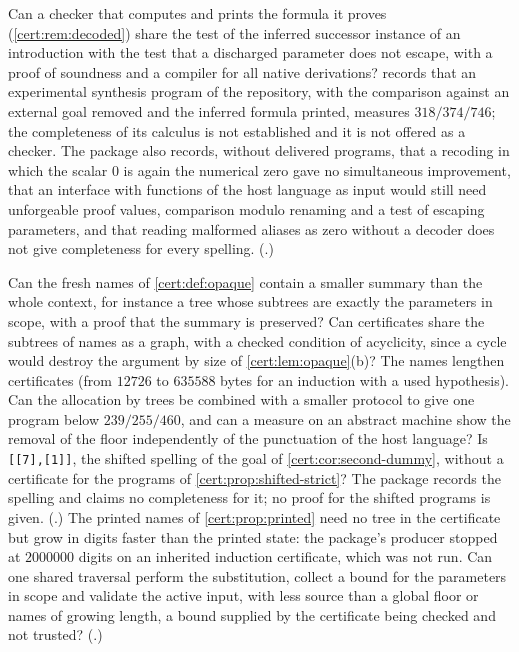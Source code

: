 \begin{question}
Can a checker that computes and prints the formula it proves (\cref{cert:rem:decoded}) share the test of
the inferred successor instance of an introduction with the test that a discharged parameter does not
escape, with a proof of soundness and a compiler for all native derivations?  records
that an experimental synthesis program of the repository, with the comparison against an external goal
removed and the inferred formula printed, measures $318/374/746$; the completeness of its calculus is not
established and it is not offered as a checker. The package also records, without delivered programs, that
a recoding in which the scalar $0$ is again the numerical zero gave no simultaneous improvement, that an
interface with functions of the host language as input would still need unforgeable proof values, comparison
modulo renaming and a test of escaping parameters, and that reading malformed aliases as zero without a
decoder does not give completeness for every spelling. (.)
\end{question}

\begin{question}
Can the fresh names of \cref{cert:def:opaque} contain a smaller summary than the whole context, for
instance a tree whose subtrees are exactly the parameters in scope, with a proof that the summary
is preserved? Can certificates share the subtrees of names as a graph, with a checked condition of
acyclicity, since a cycle would destroy the argument by size of \cref{cert:lem:opaque}(b)? The
names lengthen certificates (from $12726$ to $635588$ bytes for an induction with a used
hypothesis). Can the allocation by trees be combined with a smaller protocol to give one program
below $239/255/460$, and can a measure on an abstract machine show the removal of the floor
independently of the punctuation of the host language? Is \texttt{[[7],[1]]}, the shifted spelling
of the goal of \cref{cert:cor:second-dummy}, without a certificate for the programs of
\cref{cert:prop:shifted-strict}? The package records the spelling and claims no completeness for
it; no proof for the shifted programs is given. (.) The printed names of
\cref{cert:prop:printed} need no tree in the certificate but grow in digits faster than the printed state:
the package's producer stopped at $2000000$ digits on an inherited induction certificate, which was not
run. Can one shared traversal perform the substitution, collect a bound for the parameters in scope and
validate the active input, with less source than a global floor or names of growing length, a bound
supplied by the certificate being checked and not trusted? (.)
\end{question}

